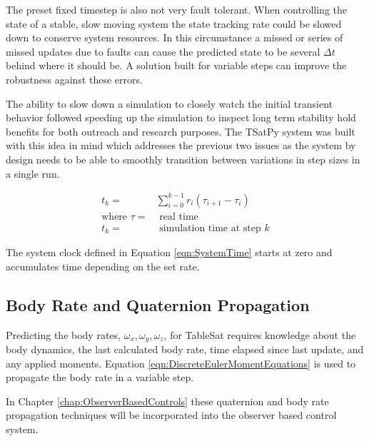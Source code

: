 The preset fixed timestep is also not very fault tolerant.  When controlling the state of a stable, slow moving system the state tracking rate could be slowed down to conserve system resources.  In this circumstance a missed or series of missed updates due to faults can cause the predicted state to be several $\Delta t$ behind where it should be.  A solution built for variable steps can improve the robustness against these errors.

The ability to slow down a simulation to closely watch the initial transient behavior followed speeding up the simulation to inspect long term stability hold benefits for both outreach and research purposes.  The TSatPy system was built with this idea in mind which addresses the previous two issues as the system by design needs to be able to smoothly transition between variations in step sizes in a single run.

\begin{equation}
  \begin{aligned}
    t_k =& \sum\limits_{i=0}^{k-1} r_i (\tau_{i+1} - \tau_i)\\
    \text{where } \tau =& \text{ real time} \\
    t_k =& \text{ simulation time at step }k
  \end{aligned}
  \label{eqn:SystemTime}
\end{equation}

The system clock defined in Equation \ref{eqn:SystemTime} starts at zero and accumulates time depending on the set rate.

\subsection{Body Rate and Quaternion Propagation}
\label{subsec:BodyRateQuaternionPropagation}

Predicting the body rates, $\omega_x, \omega_y, \omega_z$, for TableSat requires knowledge about the body dynamics, the last calculated body rate, time elapsed since last update, and any applied moments.  Equation \ref{eqn:DiscreteEulerMomentEquations} is used to propagate the body rate in a variable step.

In Chapter \ref{chap:ObserverBasedControls} these quaternion and body rate propagation techniques will be incorporated into the observer based control system.
